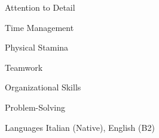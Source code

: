 
\begin{cvskills}
  \cvskill
    {Attention to Detail} %
    {} %

  \cvskill
    {Time Management} %
    {} %

  \cvskill
    {Physical Stamina} %
    {} %
    
  \cvskill
    {Teamwork} %
    {} %

  \cvskill
    {Organizational Skills} %
    {} %

  \cvskill
    {Problem-Solving} %
    {} %

  \cvskill
    {Languages} %
    {Italian (Native), English (B2)} %

\end{cvskills}
